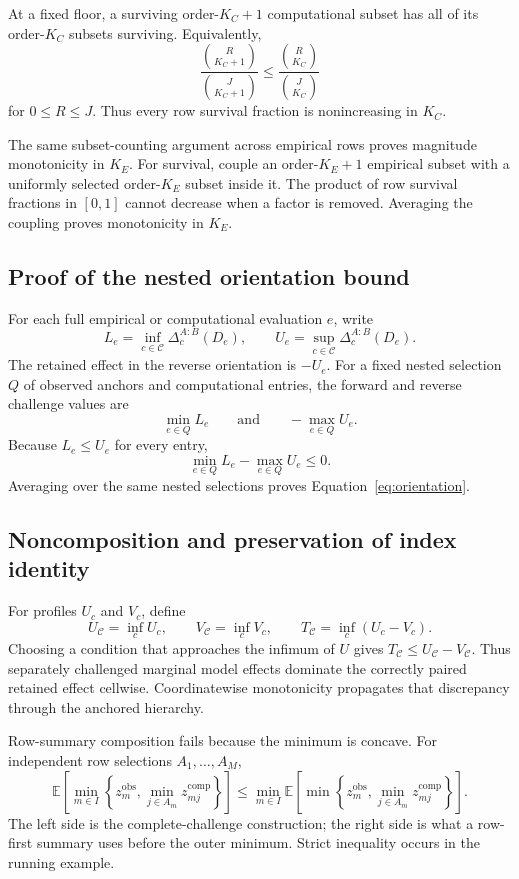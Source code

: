 \documentclass[11pt]{article}
\newcommand{\CSet}{\mathcal{C}}
\newcommand{\E}{\mathbb{E}}
\theoremstyle{remark}
\begin{document}
At a fixed floor, a surviving order-$K_C+1$ computational subset has all of
its order-$K_C$ subsets surviving. Equivalently,
\[
\frac{\binom{R}{K_C+1}}{\binom{J}{K_C+1}}
\leq
\frac{\binom{R}{K_C}}{\binom{J}{K_C}}
\]
for $0\leq R\leq J$. Thus every row survival fraction is nonincreasing in
$K_C$.

The same subset-counting argument across empirical rows proves magnitude
monotonicity in $K_E$. For survival, couple an order-$K_E+1$ empirical subset
with a uniformly selected order-$K_E$ subset inside it. The product of row
survival fractions in $[0,1]$ cannot decrease when a factor is removed.
Averaging the coupling proves monotonicity in $K_E$.

\subsection{Proof of the nested orientation bound}

For each full empirical or computational evaluation $e$, write
\[
L_e=\inf_{c\in\CSet}\Delta_c^{A:B}(D_e),
\qquad
U_e=\sup_{c\in\CSet}\Delta_c^{A:B}(D_e).
\]
The retained effect in the reverse orientation is $-U_e$. For a fixed nested
selection $Q$ of observed anchors and computational entries, the forward and
reverse challenge values are
\[
\min_{e\in Q}L_e
\qquad\text{and}\qquad
-\max_{e\in Q}U_e.
\]
Because $L_e\leq U_e$ for every entry,
\[
\min_{e\in Q}L_e-\max_{e\in Q}U_e\leq0.
\]
Averaging over the same nested selections proves
Equation~\eqref{eq:orientation}.

\subsection{Noncomposition and preservation of index identity}

For profiles $U_c$ and $V_c$, define
\[
U_\CSet=\inf_cU_c,
\qquad
V_\CSet=\inf_cV_c,
\qquad
T_\CSet=\inf_c(U_c-V_c).
\]
Choosing a condition that approaches the infimum of $U$ gives
$T_\CSet\leq U_\CSet-V_\CSet$. Thus separately challenged marginal model
effects dominate the correctly paired retained effect cellwise. Coordinatewise
monotonicity propagates that discrepancy through the anchored hierarchy.

Row-summary composition fails because the minimum is concave. For independent
row selections $A_1,\ldots,A_M$,
\[
\E\!\left[
\min_{m\in I}
\left\{
z_m^{\mathrm{obs}},
\min_{j\in A_m}z_{mj}^{\mathrm{comp}}
\right\}
\right]
\leq
\min_{m\in I}
\E\!\left[
\min\left\{
z_m^{\mathrm{obs}},
\min_{j\in A_m}z_{mj}^{\mathrm{comp}}
\right\}
\right].
\]
The left side is the complete-challenge construction; the right side is what a
row-first summary uses before the outer minimum. Strict inequality occurs in
the running example.
\end{document}
